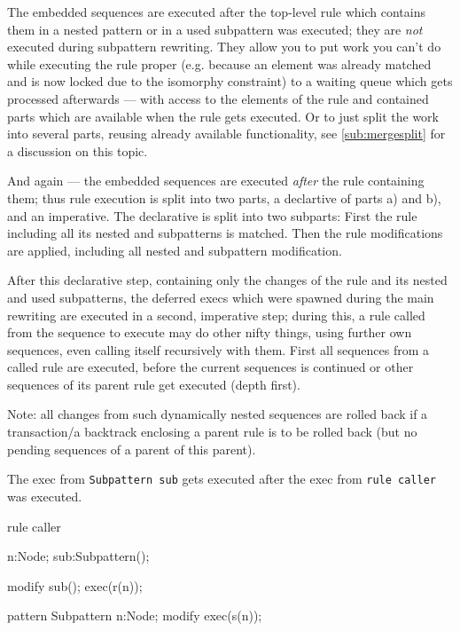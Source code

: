 \begin{note}
The embedded sequences are executed after the top-level rule which contains them in a nested pattern or in a used  subpattern was executed; they are \emph{not} executed during subpattern rewriting. They allow you to put work you can't do while executing the rule proper (e.g. because an element was already matched and is now locked due to the isomorphy constraint) to a waiting queue which gets processed afterwards --- with access to the elements of the rule and contained parts which are available when the rule gets executed. Or to just split the work into several parts, reusing already available functionality, see \ref{sub:mergesplit} for a discussion on this topic.
\end{note}

\begin{note}
And again --- the embedded sequences are executed \emph{after} the rule containing them;
thus rule execution is split into two parts, a declartive of parts a) and b), and an imperative.
The declarative is split into two subparts:
First the rule including all its nested and subpatterns is matched.
Then the rule modifications are applied, including all nested and subpattern modification.

After this declarative step, containing only the changes of the rule and its nested and used subpatterns,
the deferred execs which were spawned during the main rewriting are executed in a second, imperative step;
during this, a rule called from the sequence to execute may do other nifty things, 
using further own sequences, even calling itself recursively with them.
First all sequences from a called rule are executed, before the current sequences is continued or other sequences of its parent rule get executed (depth first).

Note: all changes from such dynamically nested sequences are rolled back if a transaction/a backtrack enclosing a parent rule is to be rolled back (but no pending sequences of a parent of this parent).
\end{note}

\begin{example}
	The exec from \texttt{Subpattern sub} gets executed after the exec from \texttt{rule caller} was executed.
	\begin{grgen}
rule caller
{
  n:Node;
  sub:Subpattern();
    
  modify {
    sub();
    exec(r(n));
  }
}  
pattern Subpattern
{
  n:Node;
  modify {
    exec(s(n));
  }
}
	\end{grgen}
\end{example}

